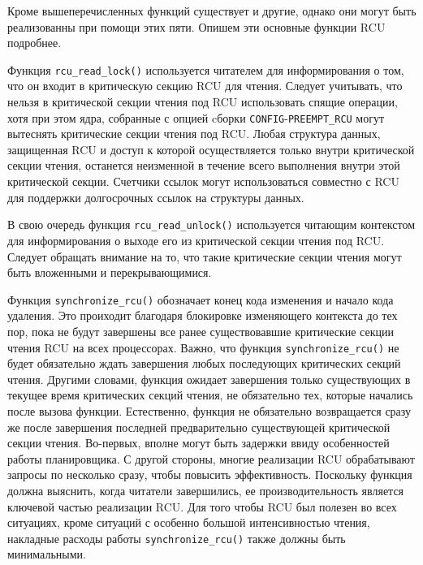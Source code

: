 Кроме вышеперечисленных функций существует и другие, однако они могут быть
реализованны при помощи этих пяти. Опишем эти основные функции RCU подробнее.

Функция \texttt{rcu\_read\_lock()} используется читателем для информирования о
том, что он входит в критическую секцию RCU для чтения. Следует учитывать, что
нельзя в критической секции чтения под RCU использовать спящие операции, хотя
при этом ядра, собранные с опцией cборки \texttt{CONFIG}-\texttt{PREEMPT\_RCU} могут вытеснять
критические секции чтения под RCU. Любая структура данных, защищенная RCU и
доступ к которой осуществляется только внутри критической секции чтения,
останется неизменной в течение всего выполнения внутри этой критической секции.
Счетчики ссылок могут использоваться совместно с RCU для поддержки долгосрочных
ссылок на структуры данных.

В свою очередь функция \texttt{rcu\_read\_unlock()} используется читающим
контекстом для информирования о выходе его из критической секции чтения под RCU.
Следует обращать внимание на то, что такие критические секции чтения могут быть
вложенными и перекрывающимися.

Функция \texttt{synchronize\_rcu()} обозначает конец кода изменения и начало
кода удаления. Это проиходит благодаря блокировке изменяющего контекста до тех
пор, пока не будут завершены все ранее существовавшие критические секции чтения
RCU на всех процессорах. Важно, что функция \texttt{synchronize\_rcu()} не будет
обязательно ждать завершения любых последующих критических секций чтения.
Другими словами, функция ожидает завершения только существующих в текущее время
критических секций чтения, не обязательно тех, которые начались после вызова
функции. Естественно, функция не обязательно возвращается сразу же после
завершения последней предварительно существующей критической секции чтения.
Во-первых, вполне могут быть задержки ввиду особенностей работы планировщика. С
другой стороны, многие реализации RCU обрабатывают запросы по несколько сразу,
чтобы повысить эффективность. Поскольку функция должна выяснить, когда читатели
завершились, ее производительность является ключевой частью реализации RCU. Для
того чтобы RCU был полезен во всех ситуациях, кроме ситуаций с особенно большой
интенсивностью чтения, накладные расходы работы \texttt{synchronize\_rcu()}
также должны быть минимальными.

